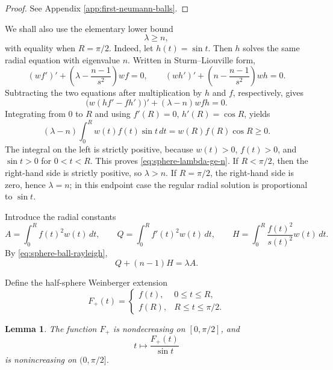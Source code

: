 \documentclass[10pt,a4paper]{amsart}
\newtheorem{lemma}[theorem]{Lemma}
\begin{document}
\begin{proof}
See Appendix \ref{app:first-neumann-balls}.
\end{proof}

We shall also use the elementary lower bound
\begin{equation}\label{eq:sphere-lambda-ge-n}
        \lambda\ge n,
\end{equation}
with equality when $R=\pi/2$.  Indeed, let $h(t)=\sin t$.  Then $h$ solves the same radial equation with eigenvalue $n$.  Written in Sturm--Liouville form,
$$
        (wf')'+\left(\lambda-\frac{n-1}{s^2}\right)wf=0,
        \qquad
        (wh')'+\left(n-\frac{n-1}{s^2}\right)wh=0.
$$
Subtracting the two equations after multiplication by $h$ and $f$, respectively, gives
$$
        \bigl(w(hf'-fh')\bigr)'+(\lambda-n)wfh=0.
$$
Integrating from $0$ to $R$ and using $f'(R)=0$, $h'(R)=\cos R$, yields
$$
        (\lambda-n)\int_0^R w(t)f(t)\sin t\,dt
        =w(R)f(R)\cos R\ge0.
$$
The integral on the left is strictly positive, because $w(t)>0$, $f(t)>0$, and $\sin t>0$ for $0<t<R$.  This proves \eqref{eq:sphere-lambda-ge-n}.  If $R<\pi/2$, then the right-hand side is strictly positive, so $\lambda>n$.  If $R=\pi/2$, the right-hand side is zero, hence $\lambda=n$; in this endpoint case the regular radial solution is proportional to $\sin t$.

Introduce the radial constants
\begin{equation}\label{eq:sphere-AQH-def}
        A=\int_0^R f(t)^2w(t)\,dt,
        \qquad
        Q=\int_0^R f'(t)^2w(t)\,dt,
        \qquad
        H=\int_0^R \frac{f(t)^2}{s(t)^2}w(t)\,dt.
\end{equation}
By \eqref{eq:sphere-ball-rayleigh},
\begin{equation}\label{eq:sphere-eigen-identity}
        Q+(n-1)H=\lambda A.
\end{equation}

Define the half-sphere Weinberger extension
\begin{equation}\label{eq:sphere-F-plus-def}
        F_+(t)=
        \begin{cases}
        f(t),&0\le t\le R,\\
        f(R),&R\le t\le \pi/2.
        \end{cases}
\end{equation}

\begin{lemma}\label{lem:sphere-F-plus-over-sin}
The function $F_+$ is nondecreasing on $[0,\pi/2]$, and
$$
        t\longmapsto \frac{F_+(t)}{\sin t}
$$
is nonincreasing on $(0,\pi/2]$.
\end{lemma}
\end{document}

